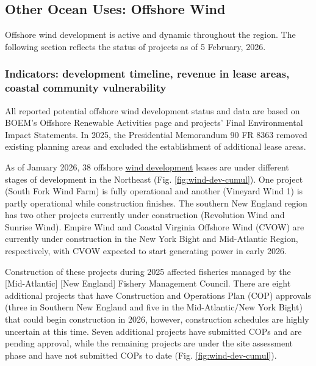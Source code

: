 \documentclass[
  10pt,
]{article}
\begin{document}
\newpage

\subsection{Other Ocean Uses: Offshore Wind}\label{other-ocean-uses-offshore-wind}

Offshore wind development is active and dynamic throughout the region. The following section reflects the status of projects as of 5 February, 2026.

\subsubsection{Indicators: development timeline, revenue in lease areas, coastal community vulnerability}\label{indicators-development-timeline-revenue-in-lease-areas-coastal-community-vulnerability}

All reported potential offshore wind development status and data are based on BOEM's Offshore Renewable Activities page and projects' Final Environmental Impact Statements. In 2025, the Presidential Memorandum 90 FR 8363 removed existing planning areas and excluded the establishment of additional lease areas.

As of January 2026, 38 offshore \href{https://noaa-edab.github.io/catalog/wind_dev_speed.html}{wind development} leases are under different stages of development in the Northeast (Fig. \ref{fig:wind-dev-cumul}). One project (South Fork Wind Farm) is fully operational and another (Vineyard Wind 1) is partly operational while construction finishes. The southern New England region has two other projects currently under construction (Revolution Wind and Sunrise Wind). Empire Wind and Coastal Virginia Offshore Wind (CVOW) are currently under construction in the New York Bight and Mid-Atlantic Region, respectively, with CVOW expected to start generating power in early 2026.

Construction of these projects during 2025 affected fisheries managed by the {[}Mid-Atlantic{]} {[}New England{]} Fishery Management Council. There are eight additional projects that have Construction and Operations Plan (COP) approvals (three in Southern New England and five in the Mid-Atlantic/New York Bight) that could begin construction in 2026, however, construction schedules are highly uncertain at this time. Seven additional projects have submitted COPs and are pending approval, while the remaining projects are under the site assessment phase and have not submitted COPs to date (Fig. \ref{fig:wind-dev-cumul}).
\end{document}

